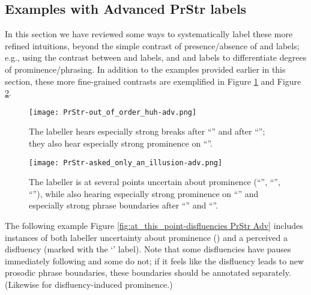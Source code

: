 \subsection{Examples with Advanced PrStr labels}\label{sec:examples-with-advanced-prstr-labels}

In this section we have reviewed some ways to systematically label these more refined intuitions, beyond the simple contrast of presence\slash absence of \textlabel{*} and \textlabel{]} labels; e.g., using the contrast between \textlabel{*} and \textlabel{**} labels, and \textlabel{]} and \textlabel{]]} labels to differentiate degrees of prominence\slash phrasing. In addition to the examples provided earlier in this section, these more fine-grained contrasts are exemplified in Figure \ref{fig:out_of_order_huh PrStr Adv} and Figure \ref{fig:asked_only_an_illusion PrStr Adv}.

\begin{figure}[H]
\centering
%
\texttt{[image: PrStr-out\_of\_order\_huh-adv.png]}
%
\caption[The labeller hears especially strong breaks after “” and after “”.]{The labeller hears especially strong breaks after “” and after “”; they also hear especially strong prominence on “”.%
\label{fig:out_of_order_huh PrStr Adv}%
}
\end{figure}

\begin{figure}[H]
\centering
%
\texttt{[image: PrStr-asked\_only\_an\_illusion-adv.png]}
%
\caption[The labeller is at several points uncertain about prominence.]{The labeller is at several points uncertain about prominence (“”, “”, “”), while also hearing especially strong prominence on “” and especially strong phrase boundaries after “” and “”.%
\label{fig:asked_only_an_illusion PrStr Adv}%
}
\end{figure}

The following example Figure \ref{fig:at_this_point-disfluencies PrStr Adv} includes instances of both labeller uncertainty about prominence () and a perceived a disfluency (marked with the ‘’ label). Note that some disfluencies have pauses immediately following and some do not; if it feels like the disfluency leads to new prosodic phrase boundaries, these boundaries should be annotated separately. (Likewise for disfluency-induced prominence.)

